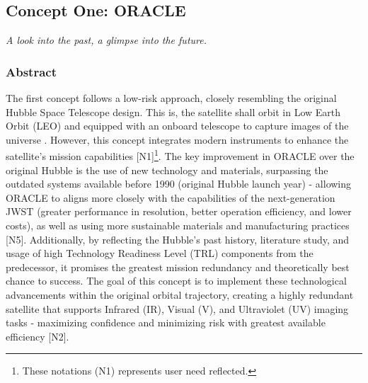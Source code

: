 \subsection{Concept One: ORACLE}
\begin{center}
        \textit{A look into the past, a glimpse into the future.}
\end{center}

\subsubsection{Abstract}
The first concept follows a low-risk approach, closely resembling the original Hubble Space Telescope design. This is, the satellite shall orbit in Low Earth Orbit (LEO) and equipped with an onboard telescope to capture images of the universe . However, this concept integrates modern instruments to enhance the satellite’s mission capabilities [N1]\footnote{These notations (N1) represents user need reflected.}. The key improvement in ORACLE over the original Hubble is the use of new technology and materials, surpassing the outdated systems available before 1990 (original Hubble launch year) - allowing ORACLE to aligns more closely with the capabilities of the next-generation JWST (greater performance in resolution, better operation efficiency, and lower costs), as well as using more sustainable materials and manufacturing practices [N5]. Additionally, by reflecting the Hubble's past history, literature study, and usage of high Technology Readiness Level (TRL) components from the predecessor, it promises the greatest mission redundancy and theoretically best chance to success. The goal of this concept is to implement these technological advancements within the original orbital trajectory, creating a highly redundant satellite that supports Infrared (IR), Visual (V), and Ultraviolet (UV) imaging tasks - maximizing confidence and minimizing risk with greatest available efficiency [N2].


